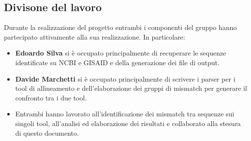 \documentclass[11pt,italian]{article}
\begin{document}
\subsection{Divisone del lavoro}
Durante la realizzazione del progetto entrambi i componenti del gruppo hanno partecipato attivamente alla sua realizzazione. In particolare:
\begin{itemize}
  \item \textbf{Edoardo Silva} si è occupato principalmente di recuperare le sequenze identificate su NCBI e GISAID e della generazione dei file di output.
  \item \textbf{Davide Marchetti} si è occupato principalmente di scrivere i parser per i tool di allineamento e dell'elaborazione dei gruppi di mismatch per generare il confronto tra i due tool.
  \item Entrambi hanno lavorato all'identificazione dei mismatch tra sequenze sui singoli tool, all'analisi ed elaborazione dei risultati e collaborato alla stesura di questo documento.
\end{itemize}
\end{document}
